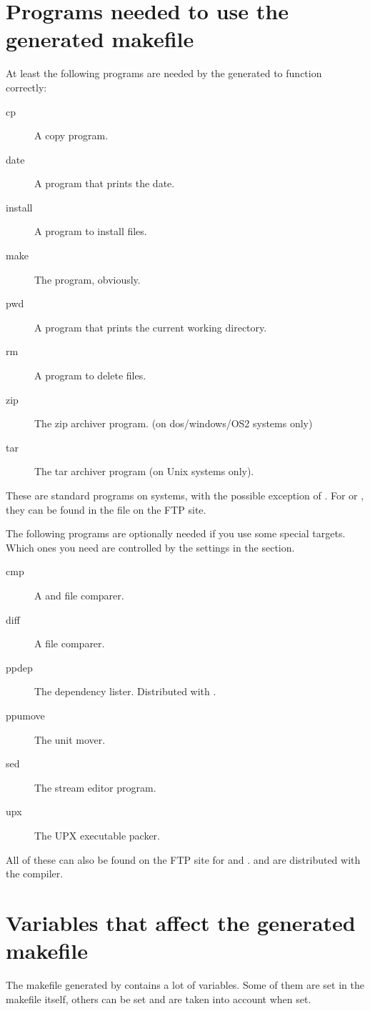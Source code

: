 \section{Programs needed to use the generated makefile}
At least the following programs are needed by the generated 
to function correctly:
\begin{description}
\item[cp] A copy program.
\item[date] A program that prints the date.
\item[install] A program to install files.
\item[make] The  program, obviously.
\item[pwd] A program that prints the current working directory.
\item[rm] A program to delete files.
\item[zip] The zip archiver program. (on dos/windows/OS2 systems only)
\item[tar] The tar archiver program (on Unix systems only).
\end{description}
These are standard programs on \linux systems, with the possible exception of
. For \dos or \windowsnt, they can be found in the
file  on the \fpc FTP site.

The following programs are optionally needed if you use some special targets.
Which ones you need are controlled by the settings in the  section.
\begin{description}
\item[cmp] A \dos and \windowsnt file comparer. 
\item[diff] A file comparer. 
\item[ppdep] The  dependency lister. Distributed with \fpc.
\item[ppumove] The \fpc unit mover. 
\item[sed] The  stream editor program. 
\item[upx] The UPX executable packer. 
\end{description}
All of these can also be found on the \fpc FTP site for \dos and \windowsnt.
 and  are distributed with the \fpc
compiler.

%
\section{Variables that affect the generated makefile}
The makefile generated by \fpcmake{} contains a lot of variables.
Some of them are set in the makefile itself, others can be set and are taken
into account when set.

